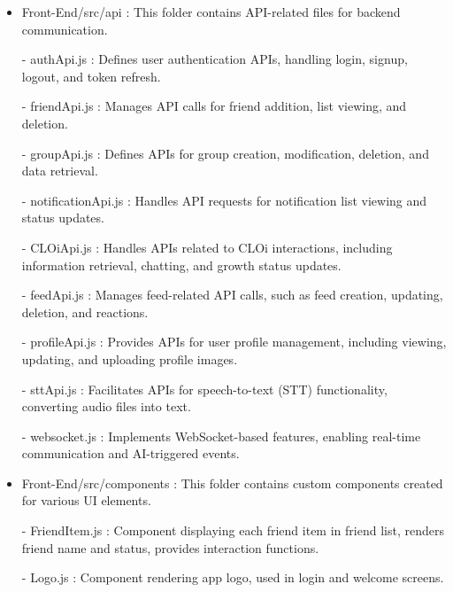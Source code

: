\begin{itemize}
                    \item Front-End/src/api : This folder contains API-related files for backend communication.
                        \item[-] authApi.js : Defines user authentication APIs, handling login, signup, logout, and token refresh.
                        \item[-] friendApi.js : Manages API calls for friend addition, list viewing, and deletion.
                        \item[-] groupApi.js : Defines APIs for group creation, modification, deletion, and data retrieval.
                        \item[-] notificationApi.js : Handles API requests for notification list viewing and status updates.
                        \item[-] CLOiApi.js : Handles APIs related to CLOi interactions, including information retrieval, chatting, and growth status updates.
                        \item[-] feedApi.js : Manages feed-related API calls, such as feed creation, updating, deletion, and reactions.
                        \item[-] profileApi.js : Provides APIs for user profile management, including viewing, updating, and uploading profile images.
                        \item[-] sttApi.js : Facilitates APIs for speech-to-text (STT) functionality, converting audio files into text.
                        \item[-] websocket.js : Implements WebSocket-based features, enabling real-time communication and AI-triggered events.

                    \vspace{3mm}
                    
                    \item Front-End/src/components : This folder contains custom components created for various UI elements.
                        \item[-] FriendItem.js : Component displaying each friend item in friend list, renders friend name and status, provides interaction functions.
                        \item[-] Logo.js : Component rendering app logo, used in login and welcome screens.
                    \vspace{3mm}
                    

\end{itemize}

